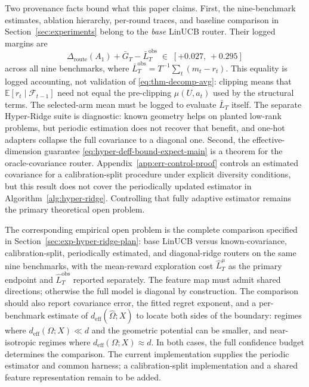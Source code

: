 \documentclass{article} %
\begin{document}
Two provenance facts bound what this paper claims. First, the nine-benchmark estimates, ablation hierarchy, per-round traces, and baseline comparison in Section~\ref{sec:experiments} belong to the \emph{base} LinUCB router. Their logged margins are
\begin{equation}
\label{eq:conc-margins}
\Delta_{\mathrm{route}}(A_1) + \bar G_T - \bar L_T^{\mathrm{obs}}
\;\in\; [+0.027,\, +0.295]
\end{equation}
across all nine benchmarks, where
\(\bar L_T^{\mathrm{obs}}=T^{-1}\sum_t(m_t-r_t)\). This equality is logged
accounting, not validation of \eqref{eq:thm-decomp-avg}: clipping means that
\(\mathbb E[r_t\mid\mathcal F_{t-1}]\) need not equal the pre-clipping
\(\mu(U,a_t)\) used by the structural terms. The selected-arm mean must be
logged to evaluate \(\bar L_T\) itself. The separate Hyper-Ridge suite is
diagnostic: known geometry helps on planted low-rank problems, but periodic
estimation does not recover that benefit, and one-hot adapters collapse the
full covariance to a diagonal one. Second, the effective-dimension guarantee
\eqref{eq:hyper-deff-bound-expect-main} is a theorem for the oracle-covariance router.
Appendix~\ref{app:err-control-proof} controls an estimated covariance for a
calibration-split procedure under explicit diversity conditions, but this
result does not cover the periodically updated estimator in
Algorithm~\ref{alg:hyper-ridge}. Controlling that fully adaptive estimator
remains the primary theoretical open problem.

The corresponding empirical open problem is the complete comparison specified in Section~\ref{sec:exp-hyper-ridge-plan}: base LinUCB versus known-covariance, calibration-split, periodically estimated, and diagonal-ridge routers on the same nine benchmarks, with the mean-reward exploration cost $\widehat L_T^\mu$ as the primary endpoint and $\widehat L_T^{\mathrm{obs}}$ reported separately. The feature map must admit shared directions; otherwise the full model is diagonal by construction. The comparison should also report covariance error, the fitted regret exponent, and a per-benchmark estimate of $d_{\mathrm{eff}}(\widehat\Omega;X)$ to locate both sides of the boundary: regimes where
$d_{\mathrm{eff}}(\Omega;X)\ll d$ and the geometric potential can be smaller,
and near-isotropic regimes where $d_{\mathrm{eff}}(\Omega;X)\approx d$. In both cases, the full confidence
budget determines the comparison. The current implementation supplies the
periodic estimator and common harness; a calibration-split implementation and
a shared feature representation remain to be added.
\end{document}
